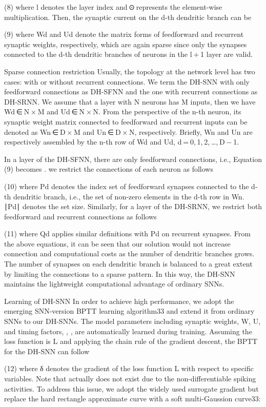 (8)
where l denotes the layer index and ⊙ represents the element-wise multiplication. Then, the synaptic current on the d-th dendritic branch can be

(9)
where Wd and Ud denote the matrix forms of feedforward and recurrent synaptic weights, respectively, which are again sparse since only the synapses connected to the d-th dendritic branches of neurons in the l + 1 layer are valid.

Sparse connection restriction
Usually, the topology at the network level has two cases: with or without recurrent connections. We term the DH-SNN with only feedforward connections as DH-SFNN and the one with recurrent connections as DH-SRNN. We assume that a layer with N neurons has M inputs, then we have Wd ∈ N × M and Ud ∈ N × N. From the perspective of the n-th neuron, its synaptic weight matrix connected to feedforward and recurrent inputs can be denoted as Wn ∈ D × M and Un ∈ D × N, respectively. Briefly, Wn and Un are respectively assembled by the n-th row of Wd and Ud, d = 0, 1, 2, …, D − 1.

In a layer of the DH-SFNN, there are only feedforward connections, i.e., Equation (9) becomes 
. we restrict the connections of each neuron as follows

(10)
where Pd denotes the index set of feedforward synapses connected to the d-th dendritic branch, i.e., the set of non-zero elements in the d-th row in Wn. ∣Pd∣ denotes the set size. Similarly, for a layer of the DH-SRNN, we restrict both feedforward and recurrent connections as follows

(11)
where Qd applies similar definitions with Pd on recurrent synapses. From the above equations, it can be seen that our solution would not increase connection and computational costs as the number of dendritic branches grows. The number of synapses on each dendritic branch is balanced to a great extent by limiting the connections to a sparse pattern. In this way, the DH-SNN maintains the lightweight computational advantage of ordinary SNNs.

Learning of DH-SNN
In order to achieve high performance, we adopt the emerging SNN-version BPTT learning algorithm33 and extend it from ordinary SNNs to our DH-SNNs. The model parameters including synaptic weights, W, U, and timing factors, 
, 
, are automatically learned during training. Assuming the loss function is L and applying the chain rule of the gradient descent, the BPTT for the DH-SNN can follow

(12)
where δ denotes the gradient of the loss function L with respect to specific variables. Note that 
 actually does not exist due to the non-differentiable spiking activities. To address this issue, we adopt the widely used surrogate gradient but replace the hard rectangle approximate curve with a soft multi-Gaussion curve33:

